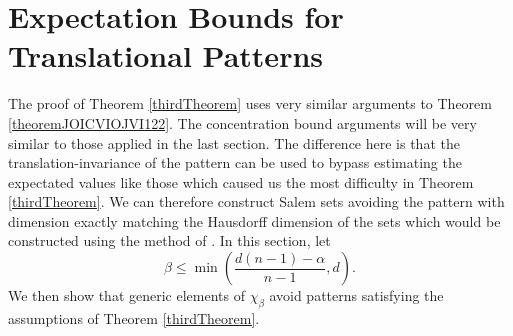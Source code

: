 \documentclass[dvipsnames,letterpaper,12pt]{article}
\numberwithin{equation}{section}
\numberwithin{theorem}{section}
\begin{document}
\section{Expectation Bounds for Translational Patterns}

The proof of Theorem \ref{thirdTheorem} uses very similar arguments to Theorem \ref{theoremJOICVIOJVI122}. The concentration bound arguments will be very similar to those applied in the last section. The difference here is that the translation-invariance of the pattern can be used to bypass estimating the expectated values like those which caused us the most difficulty in Theorem \ref{thirdTheorem}. We can therefore construct Salem sets avoiding the pattern with dimension exactly matching the Hausdorff dimension of the sets which would be constructed using the method of \cite{OurPaper}. In this section, let
%
\[ \beta \leq \min \left( \frac{d(n-1) - \alpha}{n-1}, d \right). \]
%
We then show that generic elements of $\chi_\beta$ avoid patterns satisfying the assumptions of Theorem \ref{thirdTheorem}.
\end{document}
